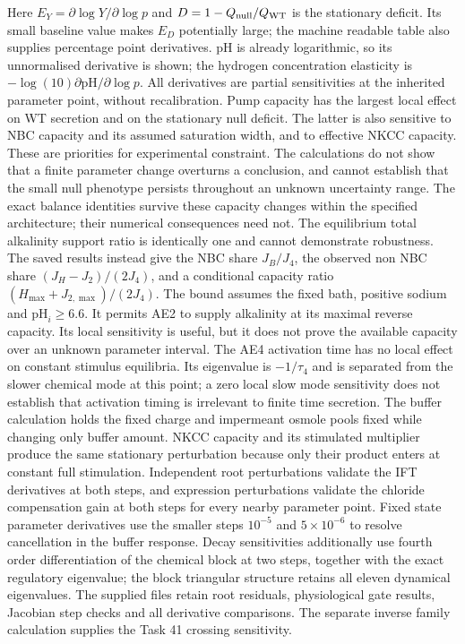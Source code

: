 Here $E_Y=\partial\log Y/\partial\log p$ and $D=1-Q_{\rm null}/Q_{\rm WT}$ is the stationary deficit. Its small baseline value makes $E_D$ potentially large; the machine readable table also supplies percentage point derivatives. pH is already logarithmic, so its unnormalised derivative is shown; the hydrogen concentration elasticity is $-\log(10)\partial\mathrm{pH}/\partial\log p$. All derivatives are partial sensitivities at the inherited parameter point, without recalibration.
Pump capacity has the largest local effect on WT secretion and on the stationary null deficit. The latter is also sensitive to NBC capacity and its assumed saturation width, and to effective NKCC capacity. These are priorities for experimental constraint. The calculations do not show that a finite parameter change overturns a conclusion, and cannot establish that the small null phenotype persists throughout an unknown uncertainty range. The exact balance identities survive these capacity changes within the specified architecture; their numerical consequences need not.
The equilibrium total alkalinity support ratio is identically one and cannot demonstrate robustness. The saved results instead give the NBC share $J_B/J_4$, the observed non NBC share $(J_H-J_2)/(2J_4)$, and a conditional capacity ratio $(H_{\max}+J_{2,\max})/(2J_4)$. The bound assumes the fixed bath, positive sodium and $\mathrm{pH}_i\geq6.6$. It permits AE2 to supply alkalinity at its maximal reverse capacity. Its local sensitivity is useful, but it does not prove the available capacity over an unknown parameter interval.
The AE4 activation time has no local effect on constant stimulus equilibria. Its eigenvalue is $-1/\tau_4$ and is separated from the slower chemical mode at this point; a zero local slow mode sensitivity does not establish that activation timing is irrelevant to finite time secretion. The buffer calculation holds the fixed charge and impermeant osmole pools fixed while changing only buffer amount. NKCC capacity and its stimulated multiplier produce the same stationary perturbation because only their product enters at constant full stimulation.
Independent root perturbations validate the IFT derivatives at both steps, and expression perturbations validate the chloride compensation gain at both steps for every nearby parameter point. Fixed state parameter derivatives use the smaller steps $10^{-5}$ and $5\times10^{-6}$ to resolve cancellation in the buffer response. Decay sensitivities additionally use fourth order differentiation of the chemical block at two steps, together with the exact regulatory eigenvalue; the block triangular structure retains all eleven dynamical eigenvalues. The supplied files retain root residuals, physiological gate results, Jacobian step checks and all derivative comparisons. The separate inverse family calculation supplies the Task 41 crossing sensitivity.
